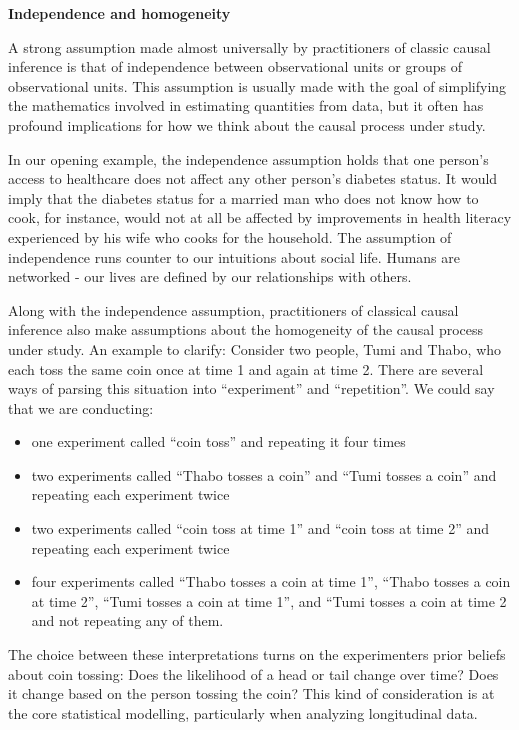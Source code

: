 \documentclass[
  letterpaper,
  DIV=11,
  numbers=noendperiod,
  oneside]{scrreprt}
\begin{document}
\textbf{Independence and homogeneity}

A strong assumption made almost universally by practitioners of classic
causal inference is that of independence between observational units or
groups of observational units. This assumption is usually made with the
goal of simplifying the mathematics involved in estimating quantities
from data, but it often has profound implications for how we think about
the causal process under study.

In our opening example, the independence assumption holds that one
person's access to healthcare does not affect any other person's
diabetes status. It would imply that the diabetes status for a married
man who does not know how to cook, for instance, would not at all be
affected by improvements in health literacy experienced by his wife who
cooks for the household. The assumption of independence runs counter to
our intuitions about social life. Humans are networked - our lives are
defined by our relationships with others.

Along with the independence assumption, practitioners of classical
causal inference also make assumptions about the homogeneity of the
causal process under study. An example to clarify: Consider two people,
Tumi and Thabo, who each toss the same coin once at time 1 and again at
time 2. There are several ways of parsing this situation into
``experiment'' and ``repetition''. We could say that we are conducting:

\begin{itemize}
\item
  one experiment called ``coin toss'' and repeating it four times
\item
  two experiments called ``Thabo tosses a coin'' and ``Tumi tosses a
  coin'' and repeating each experiment twice
\item
  two experiments called ``coin toss at time 1'' and ``coin toss at time
  2'' and repeating each experiment twice
\item
  four experiments called ``Thabo tosses a coin at time 1'', ``Thabo
  tosses a coin at time 2'', ``Tumi tosses a coin at time 1'', and
  ``Tumi tosses a coin at time 2 and not repeating any of them.
\end{itemize}

The choice between these interpretations turns on the experimenters
prior beliefs about coin tossing: Does the likelihood of a head or tail
change over time? Does it change based on the person tossing the coin?
This kind of consideration is at the core statistical modelling,
particularly when analyzing longitudinal data.
\end{document}
